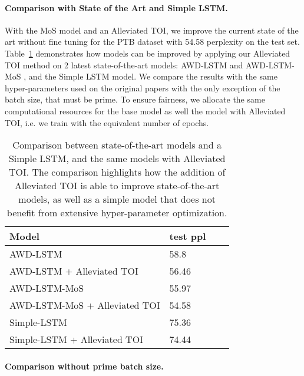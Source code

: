 \documentclass[11pt,a4paper]{article}
\begin{document}
\paragraph{Comparison with State of the Art and Simple LSTM.}

With the MoS model and an Alleviated TOI, we improve the current state of the art without fine tuning for the PTB dataset with 54.58 perplexity on the test set. Table~\ref{table: sota with mos} demonstrates how models can be improved by applying our Alleviated TOI method on 2 latest state-of-the-art models: AWD-LSTM \cite{Merity:17} and AWD-LSTM-MoS \cite{Zhilin:17}, and the Simple LSTM model. We compare the results with the same hyper-parameters used on the original papers with the only exception of the batch size, that must be prime. To ensure fairness, we allocate the same computational resources for the base model as well the model with Alleviated TOI, i.e. we train with the equivalent number of epochs.

\begin{table}[t]
\centering
\begin{tabular}{@{}llll@{}}
\toprule
  Model & test ppl\\
  \midrule
  AWD-LSTM \cite{Merity:17} & 58.8 \\
  AWD-LSTM + Alleviated TOI & 56.46 \\
  AWD-LSTM-MoS \cite{Zhilin:17} & 55.97 \\
  AWD-LSTM-MoS + Alleviated TOI & 54.58 \\
  Simple-LSTM & 75.36 \\
  Simple-LSTM + Alleviated TOI & 74.44 \\
\bottomrule
\end{tabular}
\caption{
    \label{table: sota with mos}
    Comparison between state-of-the-art models \cite{Merity:17, Zhilin:17} and a Simple LSTM, and the same models with Alleviated TOI. The comparison highlights how the addition of Alleviated TOI is able to improve state-of-the-art models, as well as a simple model that does not benefit from extensive hyper-parameter optimization.
}
\end{table}

\paragraph{Comparison without prime batch size.}
\end{document}
